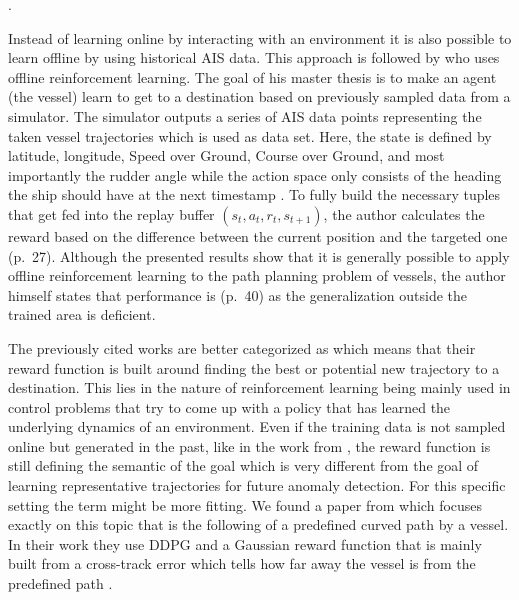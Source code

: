 \cite[pp.~21-26]{s20020426}.
\par 
Instead of learning online by interacting with an environment it is also possible to learn offline by using historical AIS data. This approach is followed by \cite{westerlund2021learning} who uses offline reinforcement learning. The goal of his master thesis is to make an agent (the vessel) learn to get to a destination based on previously sampled data from a simulator. The simulator outputs a series of AIS data points representing the taken vessel trajectories which is used as data set. Here, the state is defined by latitude, longitude, Speed over Ground, Course over Ground, and most importantly the rudder angle while the action space only consists of the heading the ship should have at the next timestamp \cite[pp.~30-33]{westerlund2021learning}. To fully build the necessary tuples that get fed into the replay buffer $(s_t, a_t, r_t, s_{t+1})$, the author calculates the reward based on the difference between the current position and the targeted one (p.~27). Although the presented results show that it is generally possible to apply offline reinforcement learning to the path planning problem of vessels, the author himself states that performance is (p.~40) as the generalization outside the trained area is deficient.
\par
The previously cited works are better categorized as  which means that their reward function is built around finding the best or potential new trajectory to a destination. This lies in the nature of reinforcement learning being mainly used in control problems that try to come up with a policy that has learned the underlying dynamics of an environment. Even if the training data is not sampled online but generated in the past, like in the work from \cite{westerlund2021learning}, the reward function is still defining the semantic of the goal which is very different from the goal of learning representative trajectories for future anomaly detection. For this specific setting the term  might be more fitting. We found a paper from \cite{martinsen2018curved} which focuses exactly on this topic that is the following of a predefined curved path by a vessel. In their work they use DDPG and a Gaussian reward function that is mainly built from a cross-track error which tells how far away the vessel is from the predefined path \cite[p.~3]{martinsen2018curved}. 



